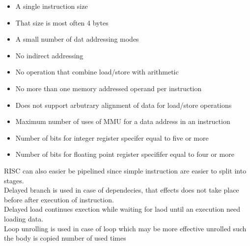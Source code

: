 \documentclass[12pt, a4paper]{article}
\begin{document}
			\begin{itemize}
				\item A single instruction size
				\item That size is most often 4 bytes
				\item A small number of dat addressing modes
				\item No indirect addressing
				\item No operation that combine load/store with arithmetic
				\item No more than one memory addressed operand per instruction
				\item Does not support arbutrary alignment of data for load/store operations
				\item Maximum number of uses of MMU for a data address in an instruction
				\item Number of bits for integer register specifer equal to five or more
				\item Number of bits for floating point register specififer equal to four or more
			\end{itemize}
			RISC can also easier be pipelined since simple instruction are easier to split into stages.\\
			Delayed branch is used in case of dependecies, that effects does not take place before after execution of instruction.\\
			Delayed load continues exection while waiting for laod until an execution need loading data.\\
			Loop unrolling is used in case of loop which may be more effective unrolled such the body is copied number of used times
\end{document}
